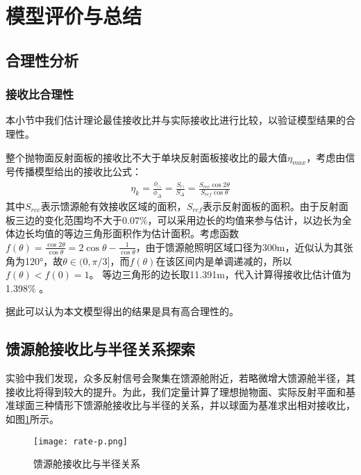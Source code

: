\documentclass[withoutpreface,bwprint,fontset=macnew]{cumcmthesis} %
\begin{document}
	\section{模型评价与总结}
	\subsection{合理性分析}
	\subsubsection {接收比合理性}
		本小节中我们估计理论最佳接收比并与实际接收比进行比较，以验证模型结果的合理性。
		
		
		整个抛物面反射面板的接收比不大于单块反射面板接收比的最大值$\eta_{max}$，考虑由信号传播模型给出的接收比公式：
		\begin{equation*}
		  \begin{aligned}
		    \eta_k = \frac{\phi_\cap}{\phi_\Delta}
		           = \frac{S_\cap}{S_\Delta}
		      	   = \frac{S_{rec} \cos 2 \theta}{S_{ref} \cos \theta}
		  \end{aligned}
		\end{equation*}
		其中$S_{rec}$表示馈源舱有效接收区域的面积，$S_{ref}$表示反射面板的面积。由于反射面板三边的变化范围均不大于$0.07\%$，可以采用边长的均值来参与估计，以边长为全体边长均值的等边三角形面积作为估计面积。考虑函数$f(\theta) = \frac{\cos 2 \theta}{\cos \theta} = 2\cos \theta - \frac{1}{\cos \theta}$，由于馈源舱照明区域口径为300m，近似认为其张角为120°，故$\theta \in (0, \pi/3]$，而$f(\theta)$在该区间内是单调递减的，所以$f(\theta) < f(0) = 1$。 
		等边三角形的边长取11.391m，代入计算得接收比估计值为1.398\% 。
		
		
		据此可以认为本文模型得出的结果是具有高合理性的。
		
		
	\subsection{馈源舱接收比与半径关系探索}
	
		实验中我们发现，众多反射信号会聚集在馈源舱附近，若略微增大馈源舱半径，其接收比将得到较大的提升。为此，我们定量计算了理想抛物面、实际反射平面和基准球面三种情形下馈源舱接收比与半径的关系，并以球面为基准求出相对接收比，如图\ref{fig:rate-p}所示。
		
		\begin{figure}[!h]
			\centering
			\texttt{[image: rate-p.png]} %
			\caption{馈源舱接收比与半径关系}
			\label{fig:rate-p}
		\end{figure}
	
\end{document}
